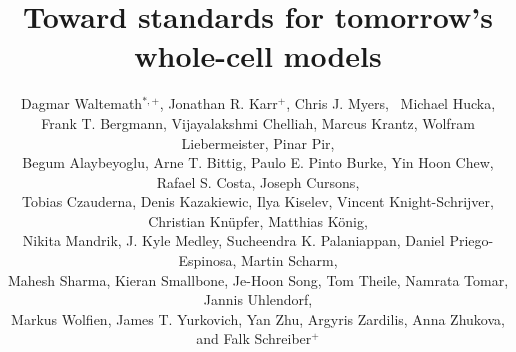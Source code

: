 \documentclass[journal,transmag]{IEEEtran}
\begin{document}
\nocite{IEEEBSTcontrol}

\title{Toward standards for tomorrow's whole-cell models}

\author{
    Dagmar Waltemath$^{*,+}$,
    Jonathan R. Karr$^+$, 
    Chris J. Myers,~
    Michael Hucka,\\
    Frank T. Bergmann,
    Vijayalakshmi Chelliah,
   Marcus Krantz,
    Wolfram Liebermeister,
   Pinar Pir,\\
    Begum Alaybeyoglu,
    Arne T. Bittig,
    Paulo E. Pinto Burke, 
    Yin Hoon Chew,
    Rafael S. Costa,
    Joseph Cursons, \\
    Tobias Czauderna,
    Denis Kazakiewic, 
    Ilya Kiselev,
    Vincent Knight-Schrijver,
    Christian Kn\"{u}pfer,
    Matthias K\"{o}nig,\\
    Nikita Mandrik,
    J. Kyle Medley,
    Sucheendra K. Palaniappan,
    Daniel Priego-Espinosa, 
    Martin Scharm,\\
    Mahesh Sharma,
    Kieran Smallbone,
    Je-Hoon Song,
    Tom Theile,
    Namrata Tomar, 
    Jannis Uhlendorf,\\
    Markus Wolfien,
    James T. Yurkovich,
    Yan Zhu, 
    Argyris Zardilis, 
    Anna Zhukova, and
    Falk Schreiber$^+$\\
	
}
\end{document}
